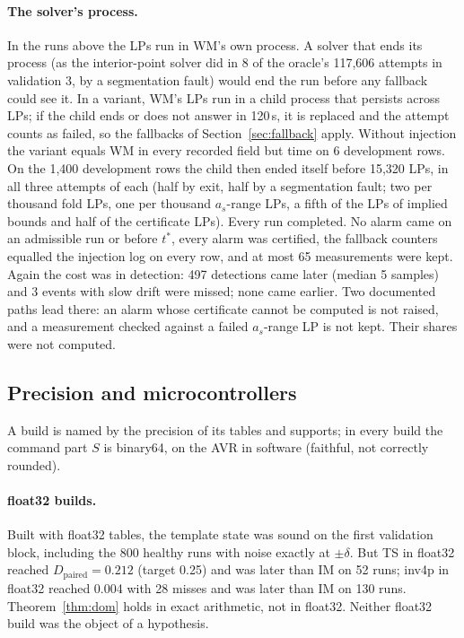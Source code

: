 \documentclass[11pt,a4paper]{article}
\newcommand{\Dp}{D_{\mathrm{paired}}}
\newcommand{\tstar}{t^{\ast}}
\begin{document}
\paragraph{The solver's process.} In the runs above the LPs run in WM's own process. A solver that ends its process (as
the interior-point solver did in 8 of the oracle's 117,606 attempts in validation 3, by a segmentation fault) would end
the run before any fallback could see it. In a variant, WM's LPs run in a child process that persists across LPs; if
the child ends or does not answer in 120\,s, it is replaced and the attempt counts as failed, so the fallbacks of
Section~\ref{sec:fallback} apply. Without injection the variant equals WM in every recorded field but time on 6 development
rows. On the 1,400 development rows the child then ended itself before 15,320 LPs, in all three attempts of each (half
by exit, half by a segmentation fault; two per thousand fold LPs, one per thousand $a_s$-range LPs, a fifth of the LPs
of implied bounds and half of the certificate LPs). Every run completed. No alarm came on an admissible run or before
$\tstar$, every alarm was certified, the fallback counters equalled the injection log on every row, and at most 65
measurements were kept. Again the cost was in detection: 497 detections came later (median 5 samples) and 3 events
with slow drift were missed; none came earlier. Two documented paths lead there: an alarm whose certificate cannot be
computed is not raised, and a measurement checked against a failed $a_s$-range LP is not kept. Their shares were not
computed.

\subsection{Precision and microcontrollers}\label{sec:mcu}

A build is named by the precision of its tables and supports; in every build the command part $S$ is binary64, on
the AVR in software (faithful, not correctly rounded).

\paragraph{float32 builds.} Built with float32 tables, the template state was sound on the first validation block,
including the 800 healthy runs with noise exactly at $\pm\delta$. But TS in float32 reached $\Dp = 0.212$ (target 0.25)
and was later than IM on 52 runs; inv4p in float32 reached 0.004 with 28 misses and was later than IM on 130 runs.
Theorem~\ref{thm:dom} holds in exact arithmetic, not in float32. Neither float32 build was the object of a hypothesis.
\end{document}
